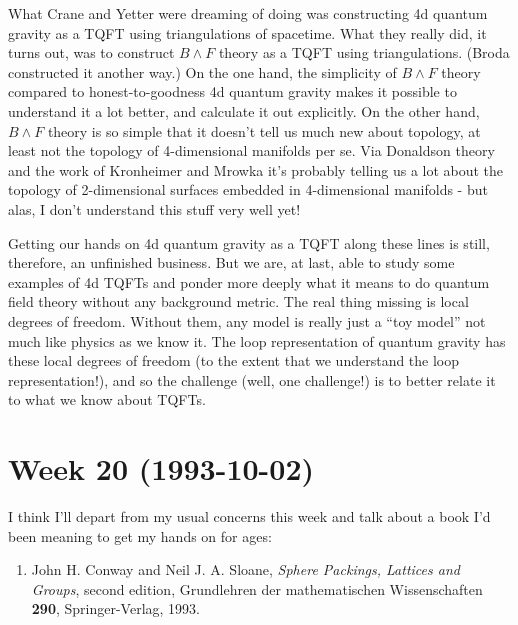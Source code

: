 \documentclass{article}
\def\tightlist{}
\begin{document}
What Crane and Yetter were dreaming of doing was constructing 4d quantum
gravity as a TQFT using triangulations of spacetime. What they really
did, it turns out, was to construct \(B\wedge F\) theory as a TQFT using
triangulations. (Broda constructed it another way.) On the one hand, the
simplicity of \(B\wedge F\) theory compared to honest-to-goodness 4d
quantum gravity makes it possible to understand it a lot better, and
calculate it out explicitly. On the other hand, \(B\wedge F\) theory is
so simple that it doesn't tell us much new about topology, at least not
the topology of 4-dimensional manifolds per se. Via Donaldson theory and
the work of Kronheimer and Mrowka it's probably telling us a lot about
the topology of 2-dimensional surfaces embedded in 4-dimensional
manifolds - but alas, I don't understand this stuff very well yet!

Getting our hands on 4d quantum gravity as a TQFT along these lines is
still, therefore, an unfinished business. But we are, at last, able to
study some examples of 4d TQFTs and ponder more deeply what it means to
do quantum field theory without any background metric. The real thing
missing is local degrees of freedom. Without them, any model is really
just a ``toy model'' not much like physics as we know it. The loop
representation of quantum gravity has these local degrees of freedom (to
the extent that we understand the loop representation!), and so the
challenge (well, one challenge!) is to better relate it to what we know
about TQFTs.
\hypertarget{week-20-1993-10-02}{%
\section{Week 20 (1993-10-02)}\label{week-20-1993-10-02}}

I think I'll depart from my usual concerns this week and talk about a
book I'd been meaning to get my hands on for ages:

\begin{enumerate}
\def\labelenumi{\arabic{enumi})}
\tightlist
\item
  John H. Conway and Neil J. A. Sloane, \emph{Sphere Packings, Lattices
  and Groups}, second edition, Grundlehren der mathematischen
  Wissenschaften \textbf{290}, Springer-Verlag, 1993.
\end{enumerate}
\end{document}

